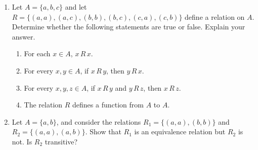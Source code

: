 \documentclass[12pt]{article}
\newcommand{\points}[1]{\marginpar{\hspace{24pt}[#1]}}
\newcommand{\R}[2]{#1\,R\,#2}
\begin{document}
\thispagestyle{fancy}

\bigskip


 \begin{enumerate}
\item Let $A = \{a,b,c\}$ and let $R=\{(a,a), (a,c), (b,b), (b,c), (c,a), (c,b)\}$ define a relation on $A$. Determine whether the following statements are true or false. Explain your answer.
\begin{enumerate}
 \item For each $x\in A$, $\R{x}{x}$. \points{1}

\vspace{1.5in}

 \item For every $x,y\in A$, if $\R{x}{y}$, then $\R{y}{x}$. \points{2}

\vspace{1.5in}

 \item For every $x,y,z\in A$, if $\R{x}{y}$ and $\R{y}{z}$, then $\R{x}{z}$.\points{2}

\vspace{1.5in}

 \item The relation $R$ defines a function from $A$ to $A$. \points{1}

\end{enumerate}
\newpage

\item Let $A=\{a,b\}$, and consider the relations $R_1=\{(a,a),(b,b)\}$ and $R_2=\{(a,a),(a,b)\}$. Show that $R_1$ is an equivalence relation but $R_2$ is not. Is $R_2$ transitive? \points{4}
 \end{enumerate}
\end{document}
